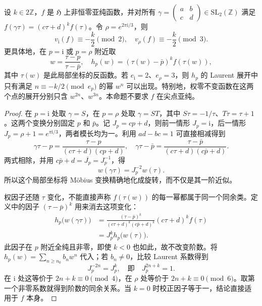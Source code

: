 \begin{proposition}[椭圆固定点的阶数限制]\label{b3:prop:23-elliptic-orders}
设 \(k\in2\mathbb Z\)，\(f\) 是 \(\mathfrak H\) 上非恒零亚纯函数，并对所有 \(\gamma=\left(\begin{smallmatrix}a&b\\c&d\end{smallmatrix}\right)\in\mathrm{SL}_2(\mathbb Z)\) 满足 \(f(\gamma\tau)=(c\tau+d)^k f(\tau)\)。令 \(\rho=e^{2\pi\mathrm{i}/3}\)，则
\[
 v_{\mathrm{i}}(f)\equiv-\frac{k}{2}\pmod2,
 \quad
 v_\rho(f)\equiv-\frac{k}{2}\pmod3.
\]
更具体地，在 \(p=\mathrm{i}\) 或 \(p=\rho\) 附近取
\[
 w=\frac{\tau-p}{\tau-\bar p},\quad
 h_p(w)=(\tau(w)-\bar p)^k f(\tau(w)),
\]
其中 \(\tau(w)\) 是此局部坐标的反函数。若 \(e_{\mathrm{i}}=2\)、\(e_\rho=3\)，则 \(h_p\) 的 Laurent 展开中只有满足 \(n\equiv-k/2\pmod{e_p}\) 的幂 \(w^n\) 可以出现。特别地，权零不变函数在这两个点的展开分别只含 \(w^{2n}\)、\(w^{3n}\)。本命题不要求 \(f\) 在尖点亚纯。
\end{proposition}
\begin{proof}
在 \(p=\mathrm{i}\) 处取 \(\gamma=S\)，在 \(p=\rho\) 处取 \(\gamma=ST\)，其中 \(S\tau=-1/\tau\)、\(T\tau=\tau+1\)。这两个变换分别固定 \(p\) 和 \(\bar p\)。记 \(J_p=cp+d\)，则前一情形 \(J_p=\mathrm{i}\)，后一情形 \(J_p=\rho+1=e^{\pi\mathrm{i}/3}\)，两者模长均为一。利用 \(ad-bc=1\) 可直接相减得到
\[
 \gamma\tau-p=\frac{\tau-p}{(c\tau+d)(cp+d)},\quad
 \gamma\tau-\bar p
 =\frac{\tau-\bar p}{(c\tau+d)(c\bar p+d)}.
\]
两式相除，并用 \(c\bar p+d=\overline{J_p}=J_p^{-1}\)，得
\[
 w(\gamma\tau)=J_p^{-2}w(\tau).
\]
所以这个局部坐标将 Möbius 变换精确地化成旋转，而不仅是其一阶近似。

权因子还随 \(\tau\) 变化，不能直接声称 \(f(\tau(w))\) 的每一幂都属于同一个同余类。定义中的因子 \((\tau-\bar p)^k\) 用来消去这项变化：
\[
 \begin{aligned}
 h_p\bigl(w(\gamma\tau)\bigr)
 &=\frac{(\tau-\bar p)^k}{(c\tau+d)^k(c\bar p+d)^k}
       (c\tau+d)^k f(\tau)\\
 &=J_p^k h_p\bigl(w(\tau)\bigr).
 \end{aligned}
\]
此因子在 \(p\) 附近全纯且非零，即使 \(k<0\) 也如此，故不改变阶数。将 \(h_p(w)=\sum_{n\ge n_0}b_nw^n\) 代入；若 \(b_n\ne0\)，比较 Laurent 系数得到
\[
 J_p^{-2n}=J_p^k,\quad\text{即}\quad J_p^{2n+k}=1.
\]
在 \(\mathrm{i}\) 处这等价于 \(2n+k\equiv0\pmod4\)，在 \(\rho\) 处等价于 \(2n+k\equiv0\pmod6\)。取第一个非零系数就得到阶数的同余关系。当 \(k=0\) 时校正因子等于一，结论直接适用于 \(f\) 本身。
\end{proof}


